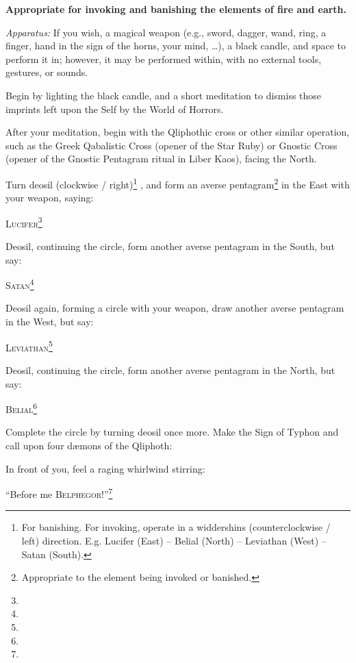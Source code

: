 
\textbf{Appropriate for invoking and banishing the elements of fire and earth.}

\textit{Apparatus:} If you wish, a magical weapon (e.g., sword, dagger, wand, ring, a finger, hand in the sign of the horns, your mind, …), a black candle, and space to perform it in; however, it may be performed within, with no external tools, gestures, or sounds.

Begin by lighting the black candle, and a short meditation to dismiss those imprints left upon the Self by the World of Horrors.

After your meditation, begin with the Qliphothic cross or other similar operation, such as the Greek Qabalistic Cross (opener of the Star Ruby) or Gnostic Cross (opener of the Gnostic Pentagram ritual in Liber Kaos), facing the North.


Turn deosil (clockwise / right)\footnote{For banishing. For invoking, operate in a widdershins (counterclockwise / left) direction. E.g. Lucifer (East) -- Belial (North) -- Leviathan (West) -- Satan (South).} , and form an averse pentagram\footnote{Appropriate to the element being invoked or banished.} in the East with your weapon, saying: \begin{quoting}
\textsc{Lucifer}\footnote{}
\end{quoting}

Deosil, continuing the circle, form another averse pentagram in the South, but say: \begin{quoting}
\textsc{Satan}\footnote{}
\end{quoting}

Deosil again, forming a circle with your weapon, draw another averse pentagram in the West, but say: \begin{quoting}
\textsc{Leviathan}\footnote{}
\end{quoting}

Deosil, continuing the circle, form another averse pentagram in the North, but say: \begin{quoting}
\textsc{Belial}\footnote{}
\end{quoting}

Complete the circle by turning deosil once more. Make the Sign of Typhon and call upon four d\ae{}mons of the Qliphoth:

 In front of you, feel a raging whirlwind stirring:\begin{quoting}\enquote{Before me \textsc{Belphegor}!}\footnote{}\end{quoting}

